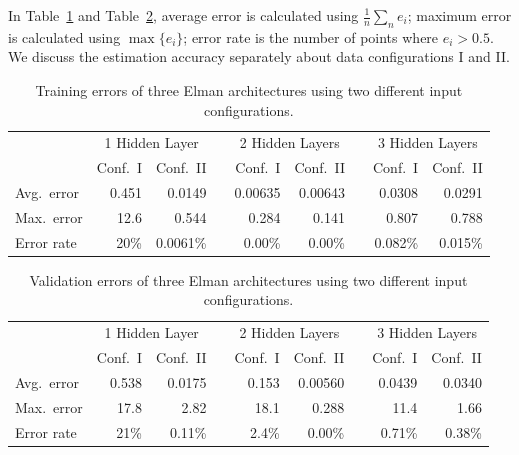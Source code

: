 In Table~\ref{tab:terr-stat} and Table~\ref{tab:verr-stat}, average
error is calculated using $\frac1n\sum_ne_i$; maximum error is
calculated using $\max\{e_i\}$; error rate is the number of points
where $e_i>0.5$. We discuss the estimation accuracy separately about
data configurations I and II.

\begin{table}[t]
    \centering
    \begingroup
    \setlength{\tabcolsep}{3.6pt} %
    \begin{tabular}{lrrcrrcrr}
        \toprule
        & \multicolumn{2}{c}{1 Hidden Layer} && \multicolumn{2}{c}{2 Hidden Layers} && \multicolumn{2}{c}{3 Hidden Layers}\\
        \cmidrule{2-3} \cmidrule{5-6} \cmidrule{8-9}
        & Conf.~I & Conf.~II && Conf.~I & Conf.~II && Conf.~I & Conf.~II\\
        \midrule
        Avg.~error & 0.451      & 0.0149    && 0.00635   & 0.00643   && 0.0308      & 0.0291    \\
        Max.~error & 12.6       & 0.544     && 0.284     & 0.141     && 0.807       & 0.788     \\
        Error rate & 20\%       & 0.0061\%  && 0.00\%    & 0.00\%    && 0.082\%     & 0.015\%   \\
        \bottomrule
    \end{tabular}
    \endgroup
    \caption{\textcolor{feb18rev}{Training errors of three Elman architectures using two
        different input configurations.}}
    \label{tab:terr-stat}
\end{table}

\begin{table}[t]
    \centering
    \begingroup
    \setlength{\tabcolsep}{3.6pt} %
    \begin{tabular}{lrrcrrcrr}
        \toprule
        & \multicolumn{2}{c}{1 Hidden Layer} && \multicolumn{2}{c}{2 Hidden Layers} && \multicolumn{2}{c}{3 Hidden Layers}\\
        \cmidrule{2-3} \cmidrule{5-6} \cmidrule{8-9}
        & Conf.~I & Conf.~II && Conf.~I & Conf.~II && Conf.~I & Conf.~II\\
        \midrule
        Avg.~error & 0.538      & 0.0175    && 0.153     & 0.00560   && 0.0439      & 0.0340    \\
        Max.~error & 17.8       & 2.82      && 18.1      & 0.288     && 11.4        & 1.66      \\
        Error rate & 21\%       & 0.11\%    && 2.4\%     & 0.00\%    && 0.71\%      & 0.38\%    \\
        \bottomrule
    \end{tabular}
    \endgroup
    \caption{\textcolor{feb18rev}{Validation errors of three Elman architectures using two
        different input configurations.}}
    \label{tab:verr-stat}
\end{table}

